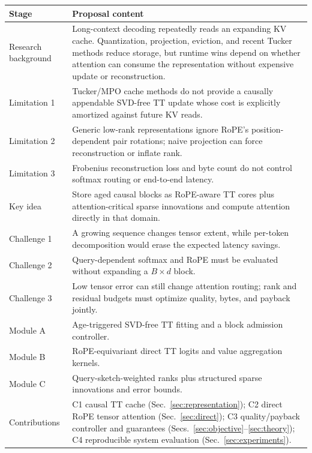 \documentclass[11pt]{article}
\begin{document}
\small
\renewcommand{\arraystretch}{1.18}
\begin{tabularx}{\textwidth}{@{}p{3.35cm}X@{}}
\toprule
\textbf{Stage} & \textbf{Proposal content} \\
\midrule
Research background & Long-context decoding repeatedly reads an expanding KV cache. Quantization,
projection, eviction, and recent Tucker methods reduce storage, but runtime wins depend on whether
attention can consume the representation without expensive update or reconstruction. \\
Limitation 1 & Tucker/MPO cache methods do not provide a causally appendable SVD-free TT update
whose cost is explicitly amortized against future KV reads. \\
Limitation 2 & Generic low-rank representations ignore RoPE's position-dependent pair rotations;
naive projection can force reconstruction or inflate rank. \\
Limitation 3 & Frobenius reconstruction loss and byte count do not control softmax routing or
end-to-end latency. \\
Key idea & Store aged causal blocks as RoPE-aware TT cores plus attention-critical sparse
innovations and compute attention directly in that domain. \\
Challenge 1 & A growing sequence changes tensor extent, while per-token decomposition would erase
the expected latency savings. \\
Challenge 2 & Query-dependent softmax and RoPE must be evaluated without expanding a $B\times d$
block. \\
Challenge 3 & Low tensor error can still change attention routing; rank and residual budgets must
optimize quality, bytes, and payback jointly. \\
Module A & Age-triggered SVD-free TT fitting and a block admission controller. \\
Module B & RoPE-equivariant direct TT logits and value aggregation kernels. \\
Module C & Query-sketch-weighted ranks plus structured sparse innovations and error bounds. \\
Contributions & C1 causal TT cache (Sec.~\ref{sec:representation}); C2 direct RoPE tensor attention
(Sec.~\ref{sec:direct}); C3 quality/payback controller and guarantees
(Secs.~\ref{sec:objective}--\ref{sec:theory}); C4 reproducible system evaluation
(Sec.~\ref{sec:experiments}). \\
\bottomrule
\end{tabularx}
\normalsize
\end{document}
